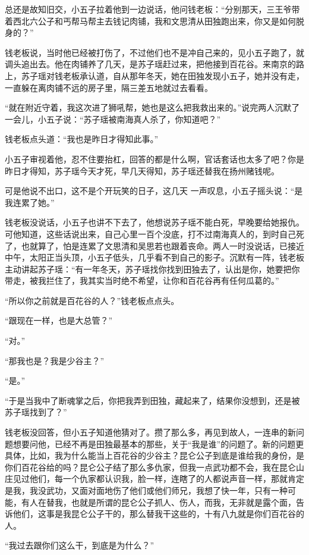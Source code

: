 总还是故知旧交，小五子拉着他到一边说话，他问钱老板：“分别那天，三王爷带着西北六公子和丐帮马帮主去钱记肉铺，我和文思清从田独跑出来，你又是如何脱身的？”

钱老板说，当时他已经被打伤了，不过他们也不是冲自己来的，见小五子跑了，就调头追出去。他在肉铺养了几天，是苏子瑶赶过来，把他接到百花谷。来南京的路上，苏子瑶对钱老板承认道，自从那年冬天，她在田独发现小五子，她并没有走，一直躲在离肉铺不远的房子里，隔三差五地就过去看看。

“就在附近守着，我这次进了狮吼帮，她也是这么把我救出来的。”说完两人沉默了一会儿，小五子说：“苏子瑶被南海真人杀了，你知道吧？”

钱老板点头道：“我也是昨日才得知此事。”

小五子审视着他，忍不住要抬杠，回答的都是什么啊，官话套话也太多了吧？你是昨日才得知，苏子瑶今天才死，早几天得知，苏子瑶还替我在扬州赌钱呢。

可是他说不出口，这不是个开玩笑的日子，这几天
一声叹息，小五子摇头说：“是我连累了她。”

钱老板没说话，小五子也讲不下去了，他想说苏子瑶不能白死，早晚要给她报仇。可他知道，这些话说出来，自己心里一百个没底，打不过南海真人的，到时自己死了，也就算了，怕是连累了文思清和吴思若也跟着丧命。两人一时没说话，已接近中午，太阳正当头顶，小五子低头，几乎看不到自己的影子。沉默有一阵，钱老板主动讲起苏子瑶：“有一年冬天，苏子瑶找你找到田独去了，认出是你，她要把你带走，被我拦住了，我其实当时绝不希望，让你和百花谷再有任何瓜葛的。”

“所以你之前就是百花谷的人？”钱老板点点头。

“跟现在一样，也是大总管？”

“对。”

“那我也是？我是少谷主？”

“是。”

“于是当我中了断魂掌之后，你把我弄到田独，藏起来了，结果你没想到，还是被苏子瑶找到了？”

钱老板没回答，但小五子知道他猜对了。攒了那么多，再见到故人，一连串的新问题想要问他，已经不再是田独最基本的那些，关于“我是谁”的问题了。新的问题更具体，比如，我为什么能当上百花谷的少谷主？昆仑公子到底是谁给我的身份，是你们百花谷给的吗？昆仑公子结了那么多仇家，但我一点武功都不会，我在昆仑山庄见过他们，每一个仇家都认识我，脸一样，连瞎了的人都说声音一样，那就肯定是我，我没武功，又面对面地伤了他们或他们师兄，我想了快一年，只有一种可能，有人在替我，也就是所谓的昆仑公子抓人、伤人，而我，无非就是露个面，告诉他们，这事是我昆仑公子干的，那么替我干这些的，十有八九就是你们百花谷的人。

“我过去跟你们这么干，到底是为什么？”

